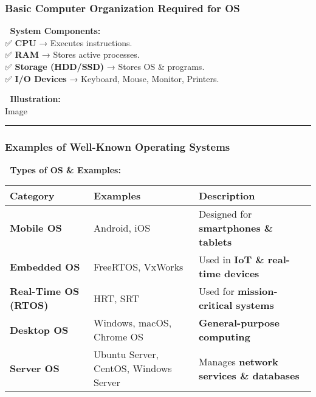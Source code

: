 \documentclass[
]{article}
\begin{document}
\subsubsection{\texorpdfstring{\textbf{Basic Computer Organization
Required for
OS}}{Basic Computer Organization Required for OS}}\label{basic-computer-organization-required-for-os}

📌 \textbf{System Components:}\\
✅ \textbf{CPU} → Executes instructions.\\
✅ \textbf{RAM} → Stores active processes.\\
✅ \textbf{Storage (HDD/SSD)} → Stores OS \& programs.\\
✅ \textbf{I/O Devices} → Keyboard, Mouse, Monitor, Printers.

📌 \textbf{Illustration:}\\
{Image}

\begin{center}\rule{0.5\linewidth}{0.5pt}\end{center}

\subsubsection{\texorpdfstring{\textbf{Examples of Well-Known Operating
Systems}}{Examples of Well-Known Operating Systems}}\label{examples-of-well-known-operating-systems}

📌 \textbf{Types of OS \& Examples:}

\begin{longtable}[]{@{}
  >{\raggedright\arraybackslash}p{}
  >{\raggedright\arraybackslash}p{}
  >{\raggedright\arraybackslash}p{}@{}}
\toprule\noalign{}
\begin{minipage}[b]{\linewidth}\raggedright
\textbf{Category}
\end{minipage} & \begin{minipage}[b]{\linewidth}\raggedright
\textbf{Examples}
\end{minipage} & \begin{minipage}[b]{\linewidth}\raggedright
\textbf{Description}
\end{minipage} \\
\midrule\noalign{}
\endhead
\bottomrule\noalign{}
\endlastfoot
\textbf{Mobile OS} & Android, iOS & Designed for \textbf{smartphones \&
tablets} \\
\textbf{Embedded OS} & FreeRTOS, VxWorks & Used in \textbf{IoT \&
real-time devices} \\
\textbf{Real-Time OS (RTOS)} & HRT, SRT & Used for
\textbf{mission-critical systems} \\
\textbf{Desktop OS} & Windows, macOS, Chrome OS &
\textbf{General-purpose computing} \\
\textbf{Server OS} & Ubuntu Server, CentOS, Windows Server & Manages
\textbf{network services \& databases} \\
\end{longtable}
\end{document}
